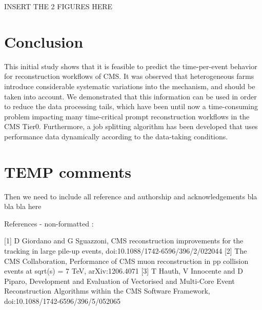 \documentclass[a4paper]{jpconf}
\begin{document}
INSERT THE 2 FIGURES HERE

\section{Conclusion}

This initial study shows that it is feasible to predict the 
time-per-event behavior for reconstruction workflows of CMS. It was 
observed that heterogeneous farms introduce considerable systematic 
variations into the mechanism, and should be taken into account. We 
demonstrated that this information can be used in order to reduce the 
data processing tails, which have been until now a time-consuming 
problem impacting many time-critical prompt reconstruction workflows 
in the CMS Tier0. Furthermore, a job splitting algorithm has been 
developed that uses performance data dynamically according to the 
data-taking conditions.


\section{TEMP comments}

Then we need to include all reference and authorship and acknowledgements bla bla bla here 

References - non-formatted :

[1] D Giordano and G Sguazzoni, CMS reconstruction improvements for the tracking in 
large pile-up events, doi:10.1088/1742-6596/396/2/022044
[2] The CMS Collaboration, Performance of CMS muon reconstruction in pp collision 
events at sqrt(s) = 7 TeV, arXiv:1206.4071
 [3] T Hauth, V Innocente and D Piparo, Development and Evaluation of Vectorised and
Multi-Core Event Reconstruction Algorithms within
the CMS Software Framework, doi:10.1088/1742-6596/396/5/052065
\end{document}
